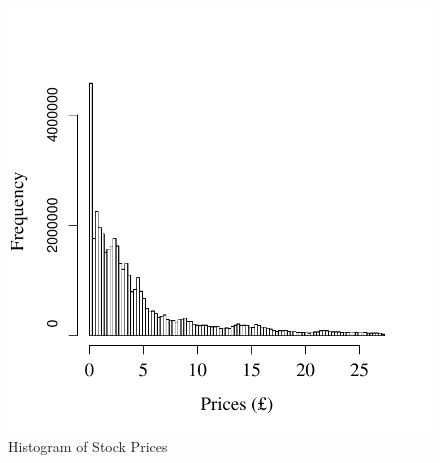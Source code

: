 \documentclass[
	USenglish,12pt,paper=a4,numbers=noenddot,abstract=on,
	final,%
	fullsample,
    ]{scrartcl}
\begin{document}
\begin{figure}[hbt!]
	\centering%
	\caption{Histogram of Stock Prices}%
	\label{fig:histogram_prices}%
	\includegraphics[width=.6\textwidth]{figures/prices_hist_login_days.pdf}
\end{figure}



\end{document}
